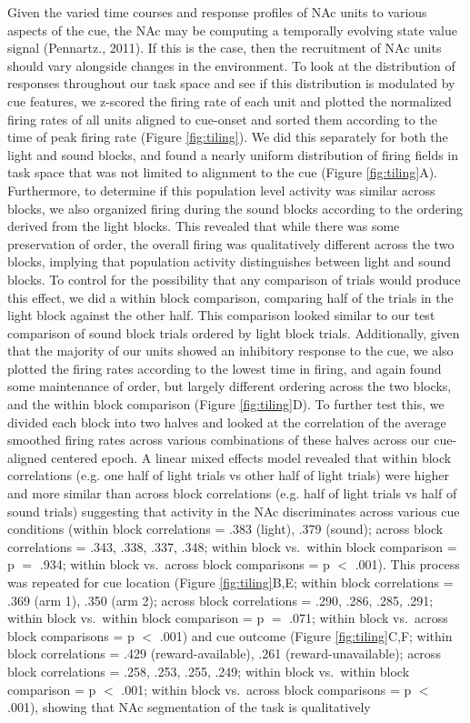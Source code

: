 \documentclass[11pt]{article}
\begin{document}
{Given the varied time courses and response profiles of NAc units to various
aspects of the cue, the NAc may be computing a temporally evolving state value
signal (Pennartz., 2011). If this is the case, then the recruitment of NAc units
should vary alongside changes in the environment. To look at the distribution of
responses throughout our task space and see if this distribution is modulated by
cue features, we z-scored the firing rate of each unit and plotted the
normalized firing rates of all units aligned to cue-onset and sorted them
according to the time of peak firing rate (Figure \ref{fig:tiling}). We did this
separately for both the light and sound blocks, and found a nearly uniform
distribution of firing fields in task space that was not limited to alignment to
the cue (Figure \ref{fig:tiling}A). Furthermore, to determine if this population
level activity was similar across blocks, we also organized firing during the
sound blocks according to the ordering derived from the light blocks. This revealed that while there was some preservation of order, the overall firing was qualitatively different
across the two blocks, implying that population activity distinguishes between light and sound blocks. To control for the possibility that any comparison of
trials would produce this effect, we did a within block comparison, comparing
half of the trials in the light block against the other half. This comparison
looked similar to our test comparison of sound block trials ordered by light
block trials. Additionally, given that the majority of our units showed an
inhibitory response to the cue, we also plotted the firing rates according to
the lowest time in firing, and again found some maintenance of order, but
largely different ordering across the two blocks, and the within block
comparison (Figure \ref{fig:tiling}D). To further test this, we divided each
block into two halves and looked at the correlation of the average smoothed
firing rates across various combinations of these halves across our cue-aligned
centered epoch. A linear mixed effects model revealed that within block
correlations (e.g. one half of light trials vs other half of light trials) were
higher and more similar than across block correlations (e.g. half of light
trials vs half of sound trials) suggesting that activity in the NAc
discriminates across various cue conditions (within block correlations = .383 (light), .379 (sound); across block correlations = .343, .338, .337, .348; within block vs.\ within block comparison = p $=$ .934; within block vs.\ across block comparisons = p $<$ .001). This process was repeated for cue location (Figure \ref{fig:tiling}B,E; within block correlations = .369 (arm 1), .350 (arm 2); across block correlations = .290, .286, .285, .291; within block vs.\ within block comparison = p $=$ .071; within block vs.\ across block comparisons = p $<$ .001) and cue outcome (Figure \ref{fig:tiling}C,F;  within block correlations = .429 (reward-available), .261 (reward-unavailable); across block correlations = .258, .253, .255, .249; within block vs.\ within block comparison = p $<$ .001; within block vs.\ across block comparisons = p $<$ .001), showing that NAc segmentation of the task is qualitatively
}
\end{document}
